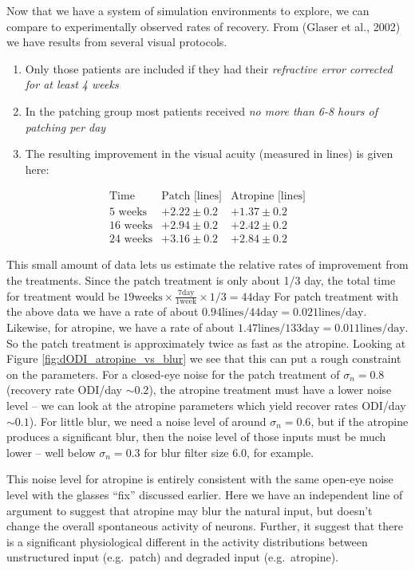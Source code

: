 \documentclass[
  onecolumn]{article}
\providecommand{\tightlist}{%
  \setlength{\itemsep}{0pt}\setlength{\parskip}{0pt}}
\begin{document}
Now that we have a system of simulation environments to explore, we can
compare to experimentally observed rates of recovery. From (Glaser et
al., 2002) we have results from several visual protocols.

\begin{enumerate}
\def\labelenumi{\arabic{enumi}.}
\tightlist
\item
  Only those patients are included if they had their \emph{refractive
  error corrected for at least 4 weeks}
\item
  In the patching group most patients received \emph{no more than 6-8
  hours of patching per day}
\item
  The resulting improvement in the visual acuity (measured in lines) is
  given here:
\end{enumerate}

\[
\begin{array}{||l|c|c||}
\text{Time}& \text{Patch [lines]}& \text{Atropine [lines]}\\ 
\text{5 weeks} & +2.22\pm 0.2& +1.37\pm 0.2 \\
\text{16 weeks} & +2.94\pm 0.2& +2.42\pm 0.2 \\
\text{24 weeks} & +3.16\pm 0.2& +2.84\pm 0.2
\end{array}
\]

This small amount of data lets us estimate the relative rates of
improvement from the treatments. Since the patch treatment is only about
1/3 day, the total time for treatment would be
\(19 \text{weeks}\times \frac{7 \text{day}}{1 \text{week}}\times 1/3=44 \text{day}\)
For patch treatment with the above data we have a rate of about
\(0.94 \text{lines} / 44 \text{day}=0.021 \text{lines}/\text{day}\).
Likewise, for atropine, we have a rate of about
\(1.47\text{lines} / 133 \text{day}=0.011 \text{lines}/\text{day}\). So
the patch treatment is approximately twice as fast as the atropine.
Looking at Figure \ref{fig:dODI_atropine_vs_blur} we see that this can
put a rough constraint on the parameters. For a closed-eye noise for the
patch treatment of \(\sigma_n=0.8\) (recovery rate ODI/day
\(\sim 0.2\)), the atropine treatment must have a lower noise level --
we can look at the atropine parameters which yield recover rates ODI/day
\(\sim 0.1\)). For little blur, we need a noise level of around
\(\sigma_n=0.6\), but if the atropine produces a significant blur, then
the noise level of those inputs must be much lower -- well below
\(\sigma_n=0.3\) for blur filter size 6.0, for example.

This noise level for atropine is entirely consistent with the same
open-eye noise level with the glasses ``fix'' discussed earlier. Here we
have an independent line of argument to suggest that atropine may blur
the natural input, but doesn't change the overall spontaneous activity
of neurons. Further, it suggest that there is a significant
physiological different in the activity distributions between
unstructured input (e.g.~patch) and degraded input (e.g.~atropine).
\end{document}
